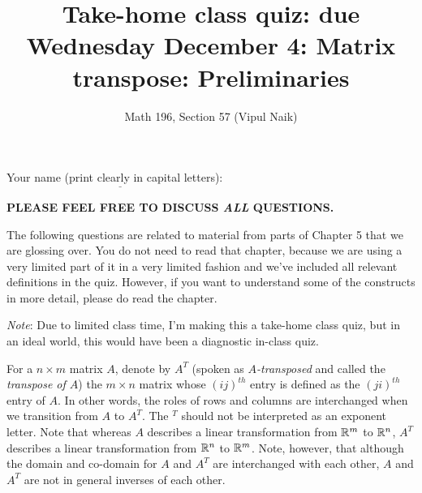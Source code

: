 \documentclass[10pt]{amsart}
\title{Take-home class quiz: due Wednesday December 4: Matrix transpose: Preliminaries}
\author{Math 196, Section 57 (Vipul Naik)}
\begin{document}
\maketitle

Your name (print clearly in capital letters): $\underline{\qquad\qquad\qquad\qquad\qquad\qquad\qquad\qquad\qquad\qquad}$

{\bf PLEASE FEEL FREE TO DISCUSS {\em ALL} QUESTIONS.}

The following questions are related to material from parts of Chapter
5 that we are glossing over. You do not need to read that chapter,
because we are using a very limited part of it in a very limited
fashion and we've included all relevant definitions in the
quiz. However, if you want to understand some of the constructs in
more detail, please do read the chapter.

{\em Note}: Due to limited class time, I'm making this a take-home
class quiz, but in an ideal world, this would have been a diagnostic
in-class quiz.

For a $n \times m$ matrix $A$, denote by $A^T$ (spoken as {\em
  $A$-transposed} and called the {\em transpose of $A$}) the $m \times
n$ matrix whose $(ij)^{th}$ entry is defined as the $(ji)^{th}$ entry
of $A$. In other words, the roles of rows and columns are interchanged
when we transition from $A$ to $A^T$. The ${}^T$ should not be
interpreted as an exponent letter. Note that whereas $A$ describes a
linear transformation from $\mathbb{R}^m$ to $\mathbb{R}^n$, $A^T$ describes a linear
transformation from $\mathbb{R}^n$ to $\mathbb{R}^m$. Note, however, that although the
domain and co-domain for $A$ and $A^T$ are interchanged with each
other, $A$ and $A^T$ are not in general inverses of each other.
\end{document}
